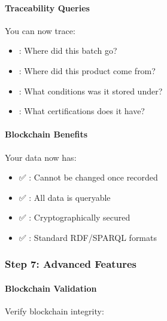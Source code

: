 \documentclass[letterpaper,10pt,english]{sphinxmanual}
\begin{document}
\paragraph{Traceability Queries}
\label{\detokenize{user-guide/first-steps:traceability-queries}}
\sphinxAtStartPar
You can now trace:
\begin{itemize}
\item {} 
\sphinxAtStartPar
{}: Where did this batch go?

\item {} 
\sphinxAtStartPar
{}: Where did this product come from?

\item {} 
\sphinxAtStartPar
{}: What conditions was it stored under?

\item {} 
\sphinxAtStartPar
{}: What certifications does it have?

\end{itemize}


\paragraph{Blockchain Benefits}
\label{\detokenize{user-guide/first-steps:blockchain-benefits}}
\sphinxAtStartPar
Your data now has:
\begin{itemize}
\item {} 
\sphinxAtStartPar
✅ : Cannot be changed once recorded

\item {} 
\sphinxAtStartPar
✅ : All data is queryable

\item {} 
\sphinxAtStartPar
✅ : Cryptographically secured

\item {} 
\sphinxAtStartPar
✅ : Standard RDF/SPARQL formats

\end{itemize}


\subsubsection{Step 7: Advanced Features}
\label{\detokenize{user-guide/first-steps:step-7-advanced-features}}

\paragraph{Blockchain Validation}
\label{\detokenize{user-guide/first-steps:blockchain-validation}}
\sphinxAtStartPar
Verify blockchain integrity:
\end{document}
